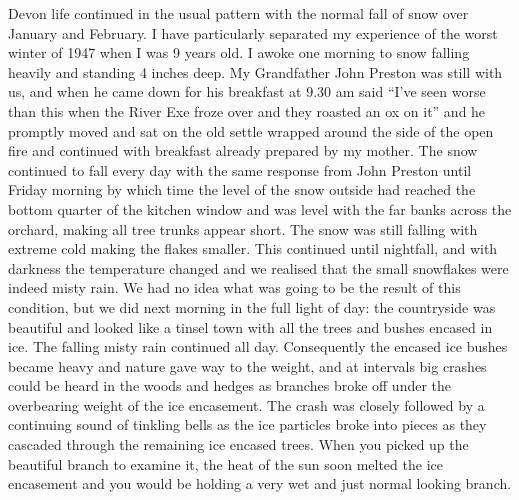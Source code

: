 Devon life continued in the usual pattern with the normal fall of snow over
January and February. I have particularly separated my experience of the worst
winter of 1947 when I was 9 years old. I awoke one morning to snow falling
heavily and standing 4 inches deep. My Grandfather John Preston was still with
us, and when he came down for his breakfast at 9.30 am said ``I've seen worse
than this when the River Exe froze over and they roasted an ox on it'' and he
promptly moved and sat on the old settle wrapped around the side of the open
fire and continued with breakfast already prepared by my mother. The snow
continued to fall every day with the same response from John Preston until
Friday morning by which time the level of the snow outside had reached the
bottom quarter of the kitchen window and was level with the far banks across
the orchard, making all tree trunks appear short. The snow was still falling
with extreme cold making the flakes smaller. This continued until nightfall,
and with darkness the temperature changed and we realised that the small
snowflakes were indeed misty rain. We had no idea what was going to be the
result of this condition, but we did next morning in the full light of day: the
countryside was beautiful and looked like a tinsel town with all the trees and
bushes encased in ice. The falling misty rain continued all day. Consequently
the encased ice bushes became heavy and nature gave way to the weight, and at
intervals big crashes could be heard in the woods and hedges as branches broke
off under the overbearing weight of the ice encasement. The crash was closely
followed by a continuing sound of tinkling bells as the ice particles broke
into pieces as they cascaded through the remaining ice encased trees. When you
picked up the beautiful branch to examine it, the heat of the sun soon melted
the ice encasement and you would be holding a very wet and just normal looking
branch.

